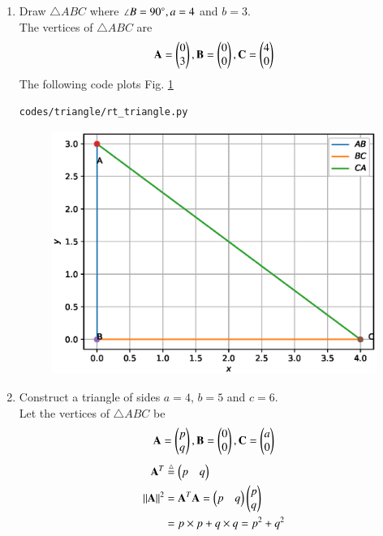 \renewcommand{\theequation}{\theenumi}
\begin{enumerate}[label=\arabic*.,ref=\thesubsection.\theenumi]

\item Draw $\triangle ABC$ where $\angle B = 90\degree, a = 4$ and $b = 3$.
\\
\solution The vertices of $\triangle ABC$ are 
\begin{align}
\mathbf{A} = \begin{pmatrix}0\\3\end{pmatrix}, \mathbf{B} = \begin{pmatrix}0\\0\end{pmatrix}, \mathbf{C} = \begin{pmatrix}4\\0\end{pmatrix}
\end{align}
%
The following code plots Fig. \ref{fig:rt_triangle}
\begin{lstlisting}
codes/triangle/rt_triangle.py
\end{lstlisting}
\begin{figure}[!ht]
\includegraphics[width=\columnwidth]{./triangle/figs/rt_triangle.eps}
\caption{}
\label{fig:rt_triangle}
\end{figure}
\item Construct a triangle of sides $a=4$, $b=5$  and $c=6$.  
\label{prob:tri}
\\
\solution Let the vertices of  $\triangle ABC$ be 
\begin{align}
\label{eq:tri_basic}
\mathbf{A} = \begin{pmatrix}p\\q\end{pmatrix}, \mathbf{B} = \begin{pmatrix}0\\0\end{pmatrix}, \mathbf{C} = \begin{pmatrix}a\\0\end{pmatrix}
\end{align}
%
\begin{align}
\label{eq:vec_def}
\mathbf{A}^T &\stackrel{\triangle}{=} \begin{pmatrix}p & q\end{pmatrix}
\\
\left\lVert\mathbf{A}\right\rVert^2 &= \mathbf{A}^T\mathbf{A} = \begin{pmatrix}p & q\end{pmatrix}\begin{pmatrix}p \\ q\end{pmatrix}
\\
&= p\times p + q\times q = p^2+q^2
\end{align}


\end{enumerate}
